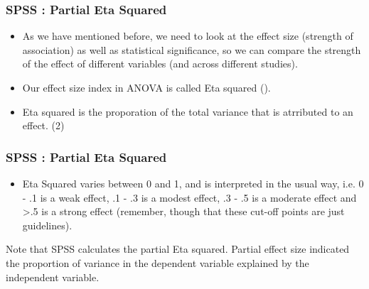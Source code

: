 \begin{frame}
\frametitle{SPSS : Partial Eta Squared}
\begin{itemize}
\item As we have mentioned before, we need to look at the effect size (strength of association) as well as statistical significance, so we can compare the strength of the effect of different variables (and across different studies).
\item Our effect size index in ANOVA is called Eta squared ().  
\item Eta squared is the proporation of the total variance that is atrributed to an effect.
 (2)
 
 \end{itemize}
\end{frame}
\begin{frame}
\frametitle{SPSS : Partial Eta Squared}
\begin{itemize}

\item Eta Squared varies between 0 and 1, and is interpreted in the usual way, i.e. 0 - .1 is a weak effect, .1 - .3 is a modest effect, .3 - .5 is a moderate effect and >.5 is a strong effect (remember, though that these cut-off points are just guidelines).
\end{itemize}
\end{frame}
\begin{frame}

Note that SPSS calculates the partial Eta squared. Partial effect size indicated the proportion of variance in the dependent variable explained by the independent variable.

\end{frame}

